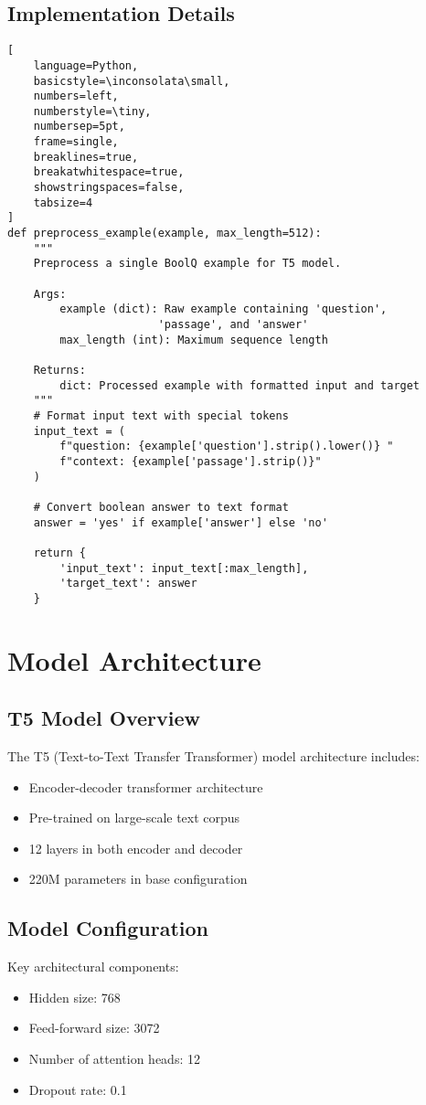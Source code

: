\documentclass[12pt,a4paper]{report}
\begin{document}
\section{Implementation Details}
\begin{lstlisting}[
    language=Python,
    basicstyle=\inconsolata\small,
    numbers=left,
    numberstyle=\tiny,
    numbersep=5pt,
    frame=single,
    breaklines=true,
    breakatwhitespace=true,
    showstringspaces=false,
    tabsize=4
]
def preprocess_example(example, max_length=512):
    """
    Preprocess a single BoolQ example for T5 model.
    
    Args:
        example (dict): Raw example containing 'question', 
                       'passage', and 'answer'
        max_length (int): Maximum sequence length
    
    Returns:
        dict: Processed example with formatted input and target
    """
    # Format input text with special tokens
    input_text = (
        f"question: {example['question'].strip().lower()} "
        f"context: {example['passage'].strip()}"
    )
    
    # Convert boolean answer to text format
    answer = 'yes' if example['answer'] else 'no'
    
    return {
        'input_text': input_text[:max_length],
        'target_text': answer
    }
\end{lstlisting}

\chapter{Model Architecture}
\section{T5 Model Overview}
The T5 (Text-to-Text Transfer Transformer) model architecture includes:

\begin{itemize}
    \item Encoder-decoder transformer architecture
    \item Pre-trained on large-scale text corpus
    \item 12 layers in both encoder and decoder
    \item 220M parameters in base configuration
\end{itemize}

\section{Model Configuration}
Key architectural components:
\begin{itemize}
    \item Hidden size: 768
    \item Feed-forward size: 3072
    \item Number of attention heads: 12
    \item Dropout rate: 0.1
\end{itemize}
\end{document}
